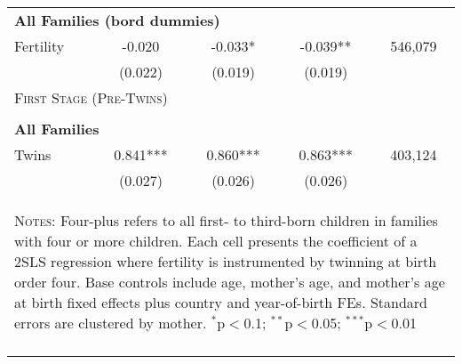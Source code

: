 \begin{table}[!htbp]
\begin{tabular}{lcccc}
\multicolumn{5}{l}{\textbf{All Families (bord dummies)}}\\ 
Fertility&-0.020&-0.033*&-0.039**&546,079\\
         &(0.022)&(0.019)&(0.019)&\\
\midrule\multicolumn{5}{l}{\textsc{First Stage (Pre-Twins)}}\\ 
&&&&\\
\multicolumn{5}{l}{\textbf{All Families}}\\ 
Twins&0.841***&0.860***&0.863***&403,124\\
         &(0.027)&(0.026)&(0.026)&\\
\hline\multicolumn{5}{p{10cm}}{\begin{footnotesize}\textsc{Notes:} Four-plus refers to all first- to third-born children in families with four or more children.  Each cell presents the coefficient of a 2SLS regression where fertility is instrumented by twinning at birth order four.  Base controls include age, mother's age, and mother's age at birth fixed effects plus country and year-of-birth FEs.  Standard errors are clustered by mother. 
$^{*}$p$<$0.1; $^{**}$p$<$0.05; $^{***}$p$<$0.01\end{footnotesize}}
\\\bottomrule\normalsize\end{tabular}\end{table} 
